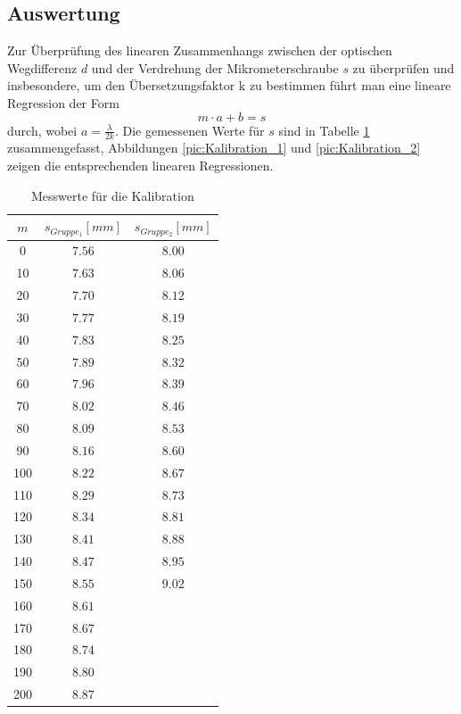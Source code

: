 \documentclass[a4paper, 11pt]{article}
\begin{document}
\subsection{Auswertung}
Zur Überprüfung des linearen Zusammenhangs zwischen der optischen Wegdifferenz $d$ und der Verdrehung der Mikrometerschraube $s$ zu überprüfen und insbesondere, um den Übersetzungsfaktor k zu bestimmen führt man eine lineare Regression der Form \[ m \cdot a + b = s\] durch, wobei $ a = \frac{\lambda}{2 k} $.
Die gemessenen Werte für $s$ sind in Tabelle \ref{table:Kalibration_Roh} zusammengefasst, Abbildungen \ref{pic:Kalibration_1} und \ref{pic:Kalibration_2} zeigen die entsprechenden linearen Regressionen.
\begin{table}[H]
	\renewcommand{\arraystretch}{1.2}
	\centering
	\begin{tabular}{|c|c|c|}
		\hline  $m$	&	$s_{Gruppe_1} [mm]$	&	$s_{Gruppe_2} [mm]$	\\
		\hline	  0	&	$ 7.56 $		&	$ 8.00$ \\
		\hline   10	&	$ 7.63 $		&	$ 8.06$ \\
		\hline   20	&	$ 7.70 $		&	$ 8.12$ \\
		\hline   30	&	$ 7.77 $		&	$ 8.19$ \\
		\hline   40	&	$ 7.83 $		&	$ 8.25$ \\
		\hline   50	&	$ 7.89 $		&	$ 8.32$ \\
		\hline   60	&	$ 7.96 $		&	$ 8.39$ \\
		\hline   70	&	$ 8.02 $		&	$ 8.46$ \\
		\hline   80	&	$ 8.09 $		&	$ 8.53$ \\
		\hline   90 &	$ 8.16 $		&	$ 8.60$ \\
		\hline  100	&	$ 8.22 $		&	$ 8.67$ \\
		\hline  110	&	$ 8.29 $		&	$ 8.73$ \\
		\hline  120	&	$ 8.34 $		&	$ 8.81$ \\
		\hline  130	&	$ 8.41 $		&	$ 8.88$ \\
		\hline  140	&	$ 8.47 $		&	$ 8.95$ \\
		\hline  150	&	$ 8.55 $		&	$ 9.02$ \\
		\hline  160	&	$ 8.61 $		&	$ $ \\
		\hline  170	&	$ 8.67 $		&	$ $ \\
		\hline  180	&	$ 8.74 $		&	$ $ \\
		\hline  190	&	$ 8.80 $		&	$ $ \\
		\hline  200	&	$ 8.87 $		&	$ $ \\
		\hline
	\end{tabular}
	\caption{Messwerte für die Kalibration}
	\label{table:Kalibration_Roh}
\end{table}
\end{document}
